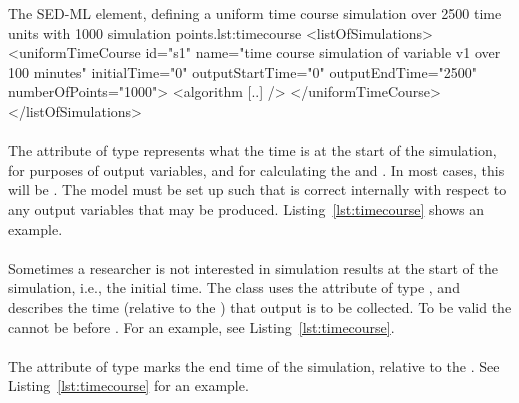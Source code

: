 
\begin{myXmlLst}{The SED-ML  element, defining a uniform time course simulation over 2500 time units with 1000 simulation points.}{lst:timecourse}
<listOfSimulations>
	<uniformTimeCourse id="s1"  name="time course simulation of variable v1 over 100 minutes"  
		initialTime="0" outputStartTime="0" outputEndTime="2500" numberOfPoints="1000">
		<algorithm [..] />
 	</uniformTimeCourse>
</listOfSimulations>
\end{myXmlLst}

\paragraph*{}
\label{sec:initialTime}
The attribute  of type  represents what the time is at the start of the simulation, for purposes of output variables, and for calculating the  and .  In most cases, this will be .  The model must be set up such that  is correct internally with respect to any output variables that may be produced.
Listing~\ref{lst:timecourse} shows an example. 

\paragraph*{}
\label{sec:outputStartTime}
Sometimes a researcher is not interested in simulation results at the start of the simulation, i.e., the initial time. The \hyperref[class:uniformTimeCourse]{} class uses the attribute  of type , and describes the time (relative to the ) that output is to be collected. To be valid the  cannot be before \hyperref[sec:initialTime]{}. For an example, see Listing~\ref{lst:timecourse}. 

\paragraph*{}
\label{sec:outputEndTime}
The attribute  of type  marks the end time of the simulation, relative to the . See Listing~\ref{lst:timecourse} for an example. 

